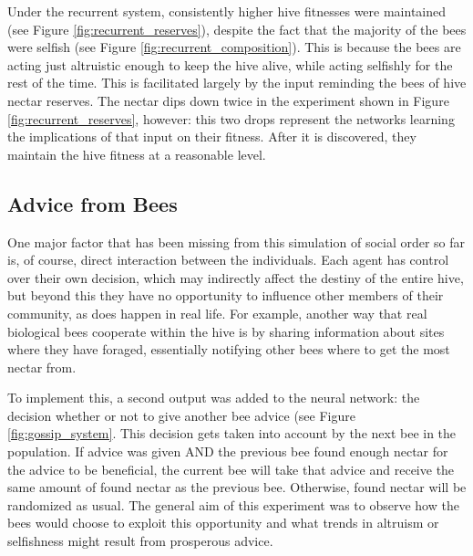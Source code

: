 \documentclass[11pt]{article}
\begin{document}
			Under the recurrent system, consistently higher hive fitnesses were maintained (see Figure \ref{fig:recurrent_reserves}), despite the fact that the majority of the bees were selfish (see Figure \ref{fig:recurrent_composition}). This is because the bees are acting just altruistic enough to keep the hive alive, while acting selfishly for the rest of the time. This is facilitated largely by the input reminding the bees of hive nectar reserves. The nectar dips down twice in the experiment shown in Figure \ref{fig:recurrent_reserves}, however: this two drops represent the networks learning the implications of that input on their fitness. After it is discovered, they maintain the hive fitness at a reasonable level.


		\subsection{Advice from Bees} %
		\label{sub:advice_from_bees}

			One major factor that has been missing from this simulation of social order so far is, of course, direct interaction between the individuals. Each agent has control over their own decision, which may indirectly affect the destiny of the entire hive, but beyond this they have no opportunity to influence other members of their community, as does happen in real life. For example, another way that real biological bees cooperate within the hive is by sharing information about sites where they have foraged, essentially notifying other bees where to get the most nectar from. 

			To implement this, a second output was added to the neural network: the decision whether or not to give another bee advice (see Figure \ref{fig:gossip_system}. This decision gets taken into account by the next bee in the population. If advice was given AND the previous bee found enough nectar for the advice to be beneficial, the current bee will take that advice and receive the same amount of found nectar as the previous bee. Otherwise, found nectar will be randomized as usual. The general aim of this experiment was to observe how the bees would choose to exploit this opportunity and what trends in altruism or selfishness might result from prosperous advice.
\end{document}
